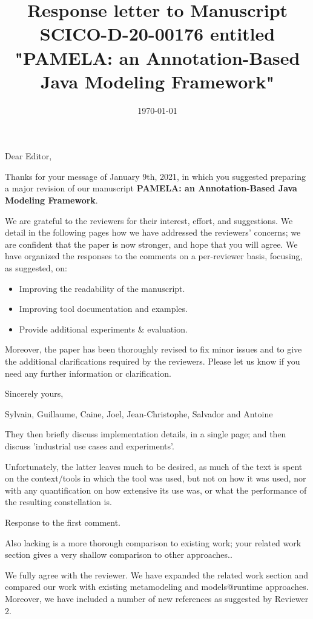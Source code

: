 \documentclass[10pt]{article}
\title{Response letter to Manuscript SCICO-D-20-00176 entitled "PAMELA: an Annotation-Based Java Modeling Framework"}
\date{\today}
\begin{document}
Dear Editor,

\bigskip
Thanks for your message of January 9th, 2021, in which you suggested preparing a major revision of our manuscript  \textbf{PAMELA: an Annotation-Based Java Modeling Framework}. 

\bigskip
We are grateful to the reviewers for their interest, effort, and suggestions. We detail in the following pages how we have addressed the reviewers' concerns; we are confident that the paper is now stronger, and hope that you will agree. We have organized the responses to the comments on a per-reviewer basis, focusing, as suggested, on: 

\begin{itemize}
\item Improving the readability of the manuscript. 
\item Improving tool documentation and examples.
\item Provide additional experiments \& evaluation.
\end{itemize}

Moreover, the paper has been thoroughly revised to fix minor issues and to give the additional clarifications required by the reviewers. Please let us know if you need any further information or clarification.

\bigskip
Sincerely yours,

\bigskip
Sylvain, Guillaume, Caine, Joel, Jean-Christophe, Salvador and Antoine

\pagebreak


\begin{response}{They then briefly discuss implementation details, in a single page; and then discuss 'industrial use cases and experiments'.

Unfortunately, the latter leaves much to be desired, as much of the text is spent on the context/tools in which the tool was used, but not on how it was used, nor with any quantification on how extensive its use was, or what the performance of the resulting constellation is.
} Response to the first comment.
\end{response}
\begin{response}{Also lacking is a more thorough comparison to existing work; your related work section gives a very shallow comparison to other approaches..}

We fully agree with the reviewer. We have expanded the related work section and compared our work with existing metamodeling and models@runtime approaches. Moreover, we have included a number of new references as suggested by Reviewer 2.

\end{response}
\end{document}

